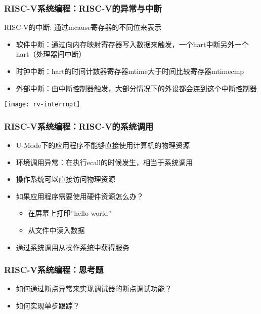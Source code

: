 
\begin{frame}
    \frametitle{RISC-V系统编程：RISC-V的异常与中断}
    RISC-V的中断: 通过mcause寄存器的不同位来表示
    
        \begin{itemize}
        \item 软件中断：通过向内存映射寄存器写入数据来触发，一个hart中断另外一个hart（处理器间中断）
        \item 时钟中断：hart的时间计数器寄存器mtime大于时间比较寄存器mtimecmp
        \item 外部中断：由中断控制器触发，大部分情况下的外设都会连到这个中断控制器
        
    \end{itemize}
    \centering
    \texttt{[image: rv-interrupt]}
    
\end{frame}


\begin{frame}
    \frametitle{RISC-V系统编程：RISC-V的系统调用}
    \begin{itemize}
    \item U-Mode下的应用程序不能够直接使用计算机的物理资源
    \item 环境调用异常：在执行ecall的时候发生，相当于系统调用
    \item 操作系统可以直接访问物理资源
    \item 如果应用程序需要使用硬件资源怎么办？

    \begin{itemize}
        \item 在屏幕上打印”hello world”
        \item 从文件中读入数据
    \end{itemize}	\pause			
    \item 通过系统调用从操作系统中获得服务
\end{itemize}

    
\end{frame}

\begin{frame}
    \frametitle{RISC-V系统编程：思考题}

    \begin{itemize}
        \item 如何通过断点异常来实现调试器的断点调试功能？
        \item 如何实现单步跟踪？

    \end{itemize}
    
    
\end{frame}

